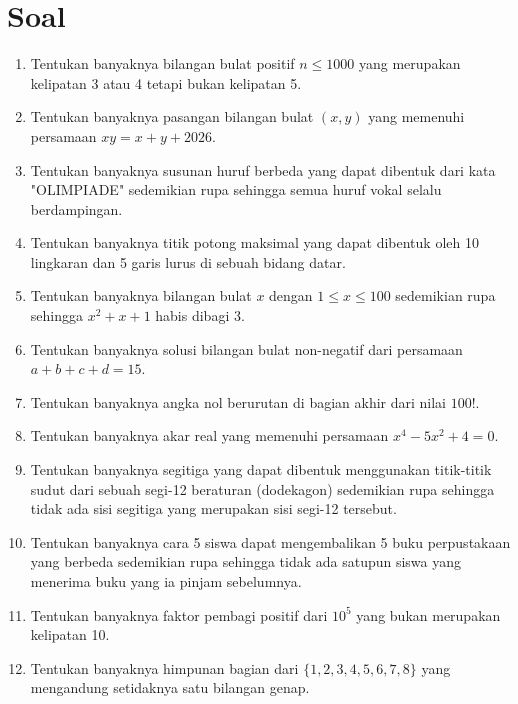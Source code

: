 \documentclass{article}
\begin{document}
\section*{Soal}
\begin{enumerate}
\item Tentukan banyaknya bilangan bulat positif $n \le 1000$ yang merupakan kelipatan 3 atau 4 tetapi bukan kelipatan 5.

\item Tentukan banyaknya pasangan bilangan bulat $(x,y)$ yang memenuhi persamaan $xy = x + y + 2026$.

\item Tentukan banyaknya susunan huruf berbeda yang dapat dibentuk dari kata "OLIMPIADE" sedemikian rupa sehingga semua huruf vokal selalu berdampingan.

\item Tentukan banyaknya titik potong maksimal yang dapat dibentuk oleh 10 lingkaran dan 5 garis lurus di sebuah bidang datar.

\item Tentukan banyaknya bilangan bulat $x$ dengan $1 \le x \le 100$ sedemikian rupa sehingga $x^2 + x + 1$ habis dibagi 3.

\item Tentukan banyaknya solusi bilangan bulat non-negatif dari persamaan $a + b + c + d = 15$.

\item Tentukan banyaknya angka nol berurutan di bagian akhir dari nilai $100!$.

\item Tentukan banyaknya akar real yang memenuhi persamaan $x^4 - 5x^2 + 4 = 0$.

\item Tentukan banyaknya segitiga yang dapat dibentuk menggunakan titik-titik sudut dari sebuah segi-12 beraturan (dodekagon) sedemikian rupa sehingga tidak ada sisi segitiga yang merupakan sisi segi-12 tersebut.

\item Tentukan banyaknya cara 5 siswa dapat mengembalikan 5 buku perpustakaan yang berbeda sedemikian rupa sehingga tidak ada satupun siswa yang menerima buku yang ia pinjam sebelumnya.

\item Tentukan banyaknya faktor pembagi positif dari $10^5$ yang bukan merupakan kelipatan 10.

\item Tentukan banyaknya himpunan bagian dari $\{1, 2, 3, 4, 5, 6, 7, 8\}$ yang mengandung setidaknya satu bilangan genap.


\end{enumerate}
\end{document}
